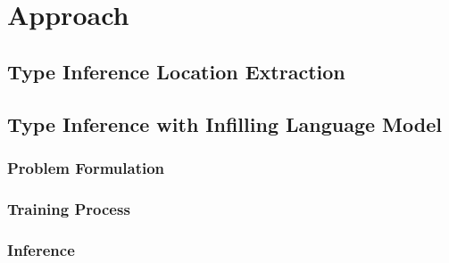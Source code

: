 \section{{\tool} Approach}
\label{sec:approach}




\subsection{Type Inference Location Extraction}


\subsection{Type Inference with Infilling Language Model}
\subsubsection{Problem Formulation}

\subsubsection{Training Process}

\subsubsection{Inference}

